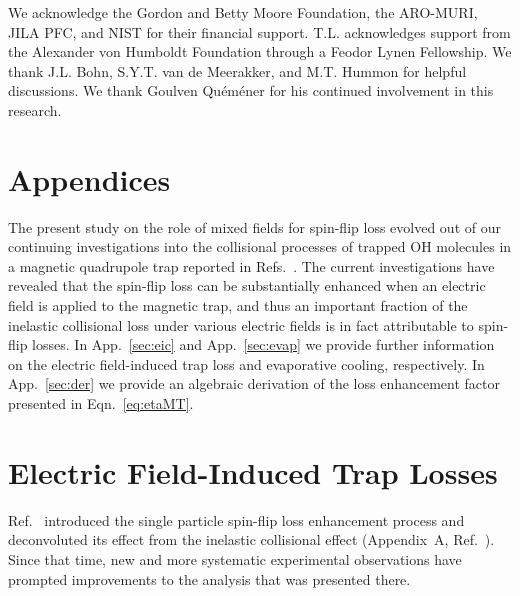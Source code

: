\documentclass[%
 reprint,
 amsmath,amssymb,
 aps,
pra,
]{revtex4-1}
\begin{document}
\begin{acknowledgments}
We acknowledge the Gordon and Betty Moore Foundation, the ARO-MURI, JILA PFC, and NIST for their financial support.
T.L. acknowledges support from the Alexander von Humboldt Foundation through a Feodor Lynen Fellowship.
We thank J.L. Bohn, S.Y.T. van de Meerakker, and M.T. Hummon for helpful discussions.
We thank Goulven Qu\'em\'ener for his continued involvement in this research.
\end{acknowledgments}

\section*{Appendices}

The present study on the role of mixed fields for spin-flip loss evolved out of our continuing investigations into the collisional processes of trapped OH molecules in a magnetic quadrupole trap reported in Refs.~\cite{Stuhl2013,Stuhl2012evap}. The current investigations have revealed that the spin-flip loss can be substantially enhanced when an electric field is applied to the magnetic trap, and thus an important fraction of the inelastic collisional loss under various electric fields is in fact attributable to spin-flip losses. In App.~\ref{sec:eic} and App.~\ref{sec:evap} we provide further information on the electric field-induced trap loss and evaporative cooling, respectively. In App.~\ref{sec:der} we provide an algebraic derivation of the loss enhancement factor presented in Eqn.~\ref{eq:etaMT}.

\appendix

\section{Electric Field-Induced Trap Losses\label{sec:eic}}

Ref.~\cite{Stuhl2013} introduced the single particle spin-flip loss enhancement process and deconvoluted its effect from the inelastic collisional effect (Appendix~A, Ref.~\cite{Stuhl2013}). Since that time, new and more systematic experimental observations have prompted improvements to the analysis that was presented there.
\end{document}
